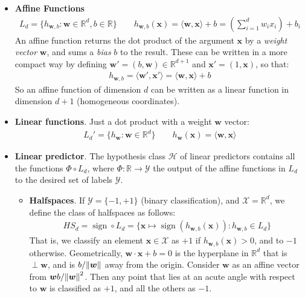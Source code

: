 \documentclass[../template.tex]{subfiles}
\begin{document}
\begin{itemize}
    \item \textbf{Affine Functions}
    \begin{align*}
        L_d= \{h_{\bm{w},b} \colon \bm{w} \in \mathbb{R}^d, b \in \mathbb{R}\} \qquad h_{\bm{w},b}(\bm{x}) = \langle \bm{w}, \bm{x} \rangle + b = \left(\sum_{i=1}^d w_i x_i\right) + b_i
    \end{align*} 
    An affine function returns the dot product of the argument $\bm{x}$ by a \textit{weight vector} $\bm{w}$, and sums a \textit{bias} $b$ to the result. These can be written in a more compact way by defining $\bm{w}' = (b, \bm{w}) \in \mathbb{R}^{d+1}$ and $\bm{x}' = (1,\bm{x})$, so that:
    \begin{align*}
        h_{\bm{w},b} = \langle \bm{w}', \bm{x}' \rangle = \langle \bm{w}, \bm{x} \rangle + b
    \end{align*}
    So an affine function of dimension $d$ can be written as a linear function in dimension $d+1$ (homogeneous coordinates).
    \item \textbf{Linear functions}.
    Just a dot product with a weight $\bm{w}$ vector:
    \begin{align*}
        L_d '= \{h_{\bm{w}} \colon \bm{w} \in \mathbb{R}^d \} \qquad h_{\bm{w}}(\bm{x}) = \langle \bm{w}, \bm{x} \rangle
    \end{align*}
    \item \textbf{Linear predictor}. The hypothesis class $\mathcal{H}$ of linear predictors contains all the functions $\Phi \circ L_d$, where $\Phi \colon \mathbb{R} \to \mathcal{Y}$  the output of the affine functions in $L_d$ to the desired set of labels $\mathcal{Y}$.
    \begin{itemize}
        \item \textbf{Halfspaces}. If $\mathcal{Y} = \{-1,+1\}$ (binary classification), and $\mathcal{X}=\mathbb{R}^d$, we define the class of halfspaces as follows:
        \begin{align*}
            HS_d = \operatorname{sign} \circ L_d = \{\bm{x} \mapsto \operatorname{sign}(h_{\bm{w},b}(\bm{x})) \colon h_{\bm{w},b} \in L_d \}
        \end{align*}  
        That is, we classify an element $\bm{x} \in \mathcal{X}$ as $+1$ if $h_{\bm{w},b}(\bm{x}) > 0$, and to $-1$ otherwise.
        Geometrically, $\bm{w} \cdot \bm{x} + b = 0$ is the hyperplane in $\mathbb{R}^d$ that is $\perp \bm{w}$, and is $b/\norm{\bm{w}}$ away from the origin. Consider $\bm{w}$ as an affine vector  from $\bm{w} b/\norm{\bm{w}}^2$. Then any point that lies at an acute angle with respect to $\bm{w}$ is classified as $+1$, and all the others as $-1$.
        

\end{itemize}
\end{itemize}
\end{document}
